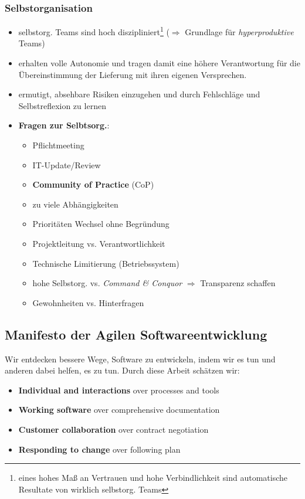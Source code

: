 \subsubsection{Selbstorganisation}
\begin{itemize}
  \item selbstorg. Teams sind hoch diszipliniert\footnote{eines hohes Maß an Vertrauen und hohe
      Verbindlichkeit sind automatische Resultate von wirklich selbstorg. Teams } ($\Rightarrow$ Grundlage für \textit{hyperproduktive} Teams)
  \item erhalten volle Autonomie und tragen damit eine höhere Verantwortung für die
    Übereinstimmung der Lieferung mit ihren eigenen Versprechen.
  \item ermutigt, absehbare Risiken einzugehen und durch Fehlschläge und
    Selbstreflexion zu lernen
  \item \textbf{Fragen zur Selbtsorg.}:
    \begin{itemize}
      \item Pflichtmeeting
      \item IT-Update/Review
      \item \textbf{Community of Practice} (CoP)
      \item zu viele Abhängigkeiten
      \item Prioritäten Wechsel ohne Begründung
      \item Projektleitung vs. Verantwortlichkeit
      \item Technische Limitierung (Betriebssystem)
      \item hohe Selbstorg. vs. \textit{Command \& Conquor} $\Rightarrow$ Transparenz schaffen
    \item Gewohnheiten vs. Hinterfragen
    \end{itemize}
\end{itemize}


\subsection{Manifesto der Agilen Softwareentwicklung}
Wir entdecken bessere Wege, Software zu entwickeln, indem wir es tun und anderen dabei helfen, es zu tun. Durch diese Arbeit schätzen wir:


\begin{itemize}
  \item \textbf{Individual and interactions} over processes and tools
  \item \textbf{Working software} over comprehensive documentation
  \item \textbf{Customer collaboration} over contract negotiation
  \item \textbf{Responding to change} over following plan
\end{itemize}


